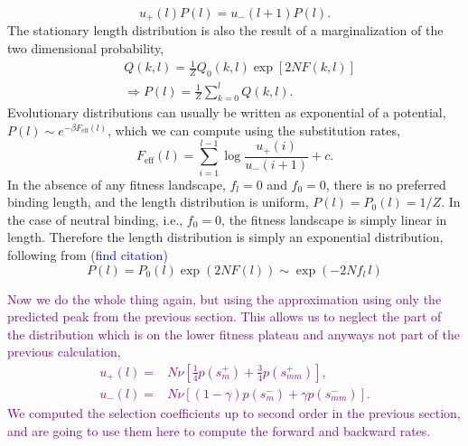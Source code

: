 \documentclass[10pt,a4paper]{article}
\begin{document}
{\begin{equation}
u_+(l)P(l)=u_-(l+1)P(l).\label{equ:det_bal}
\end{equation}
The stationary length distribution is also the result of a marginalization of the two dimensional probability,
\begin{align}
&Q(k,l)=\frac{1}{Z}Q_0(k,l)\exp\left[2NF(k,l)\right]\\
&\Rightarrow P(l) = \frac{1}{Z}\sum_{k=0}^{l}Q(k,l).
\end{align}
Evolutionary distributions can usually be written as exponential of a potential, $P(l)\sim e^{-\beta F_\mathrm{eff}(l)}$, which we can compute using the substitution rates,
\begin{equation}
	F_\mathrm{eff}(l)=\sum_{i=1}^{l-1}\log\frac{u_+(i)}{u_-(i+1)}+c.
\end{equation}
In the absence of any fitness landscape, $f_l=0$ and $f_0=0$, there is no preferred binding length, and the length distribution is uniform, $P(l)=P_0(l)=1/Z$. In the case of neutral binding, i.e., $f_0=0$, the fitness landscape is simply linear in length. Therefore the length distribution is simply an exponential distribution, following from (\textcolor{blue}{find citation})
\begin{equation}
	P(l)=P_0(l)\exp(2NF(l))\sim \exp(-2Nf_l\,l)
\end{equation}

\vspace{3cm}
\textcolor{purple}{Now we do the whole thing again, but using the approximation using only the predicted peak from the previous section. This allows us to neglect the part of the distribution which is on the lower fitness plateau and anyways not part of the previous calculation,
\begin{align}
u_+(l)=&N\nu \left[ \frac{1}{4} p\left(s^+_m \right) + \frac{3}{4} p\left(s^+_{mm} \right) \right], \label{equ:up_rate2}\\
u_-(l)=&N\nu\left[(1-\gamma) p\left(s^-_m \right) + \gamma p\left(s^-_{mm}\right)\right].\label{equ:down_rate2}
\end{align}
We computed the selection coefficients up to second order in the previous section, and are going to use them here to compute the forward and backward rates.
}
}
\end{document}
